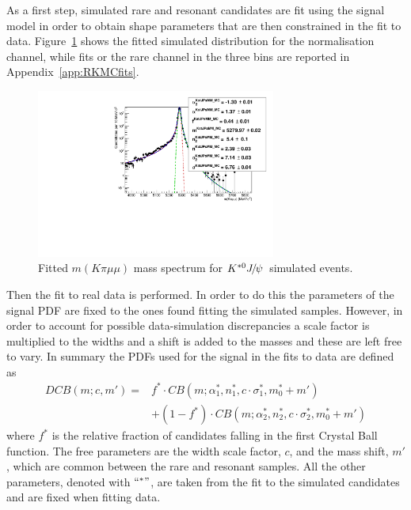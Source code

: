 As a first step, simulated rare and resonant candidates are fit using the signal model in order to obtain shape parameters
that are then constrained in the fit to data.
Figure~\ref{fig:mumu_MC_fits} shows the fitted simulated distribution for the normalisation channel, while
fits or the rare channel in the three \qsq bins are reported in Appendix~\ref{app:RKMCfits}.
%
\begin{figure}[h!]
\centering \includegraphics[width=0.7\textwidth]{RKst/figs/Fit/fit_MM/KstJPsMM_MC_log.pdf}
\caption{Fitted $m(K\pi \mu\mu)$ mass spectrum for $\Kstarz\jpsi$ simulated events. }
\label{fig:mumu_MC_fits}
\end{figure}

Then the fit to real data is performed. In order to do this the parameters of the signal PDF are fixed to the ones 
found fitting the simulated samples. However, in order to account for possible data-simulation discrepancies a scale
factor is multiplied to the widths and a shift is added to the masses and these are left free to vary. In summary the
PDFs used for the signal in the fits to data are defined as
%
\begin{equation}
\label{eq:DCB_RKst}
\begin{array} {ll}
DCB(m;c,m') = & f^{*} \cdot CB(m;\alpha_1^{*},n_1^{*},c \cdot \sigma_1^{*}, m_0^{*} + m') \\
&+ (1 - f^{*}) \cdot CB(m;\alpha_2^{*},n_2^{*},c \cdot \sigma_2^{*}, m_0^{*} + m')
\end{array}
\end{equation}  
%
where $f^{*}$ is the relative fraction of candidates falling in the first Crystal Ball function.
The free parameters are the width scale factor, $c$, and the mass shift, $m'$, which are common between
the rare and resonant samples. All the other parameters, denoted with $``^*"$, are taken from the fit to the
simulated candidates and are fixed when fitting data.

